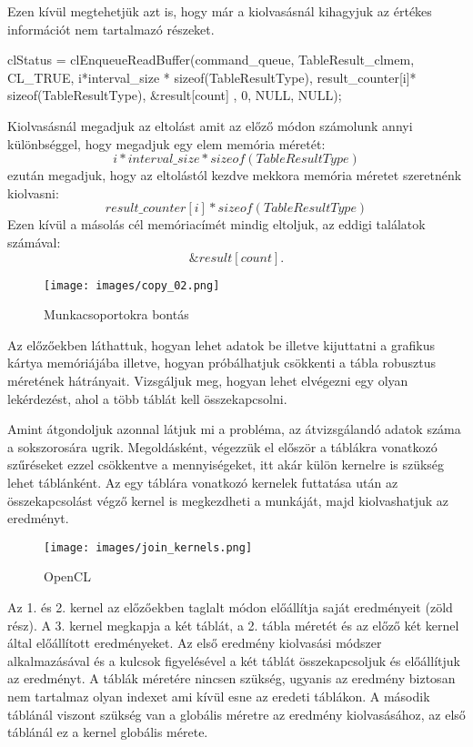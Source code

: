 Ezen kívül megtehetjük azt is, hogy már a kiolvasásnál kihagyjuk az értékes információt nem tartalmazó részeket.
\begin{python}
clStatus = clEnqueueReadBuffer(command_queue, TableResult_clmem, CL_TRUE, 
	i*interval_size * sizeof(TableResultType),
	result_counter[i]* sizeof(TableResultType), 
	&result[count]  , 0, NULL, NULL);
\end{python}

Kiolvasásnál megadjuk az eltolást amit az előző módon számolunk annyi különbséggel, hogy megadjuk egy elem memória méretét:
$$i * interval\_size * sizeof(TableResultType)$$ezután megadjuk, hogy az eltolástól kezdve mekkora memória méretet szeretnénk kiolvasni: $$result\_counter[i] * sizeof(TableResultType)$$Ezen kívül a másolás cél memóriacímét mindig eltoljuk, az eddigi találatok számával: $$\&result[count].$$

\begin{figure}[h!]
\centering
\texttt{[image: images/copy\_02.png]}
\caption{Munkacsoportokra bontás}
\label{fig:opencl}
\end{figure}


Az előzőekben láthattuk, hogyan lehet adatok be illetve kijuttatni a grafikus kártya memóriájába illetve, hogyan próbálhatjuk csökkenti a tábla robusztus méretének hátrányait.
Vizsgáljuk meg, hogyan lehet elvégezni egy olyan lekérdezést, ahol a több táblát kell összekapcsolni.

Amint átgondoljuk azonnal látjuk mi a probléma, az átvizsgálandó adatok száma a sokszorosára ugrik. Megoldásként, végezzük el először a táblákra vonatkozó szűréseket ezzel csökkentve a mennyiségeket, itt akár külön kernelre is szükség lehet táblánként.
Az egy táblára vonatkozó kernelek futtatása után az összekapcsolást végző kernel is megkezdheti a munkáját, majd kiolvashatjuk az eredményt.

\begin{figure}[h!]
\centering
\texttt{[image: images/join\_kernels.png]}
\caption{OpenCL}
\label{fig:opencl}
\end{figure}

Az 1. és 2. kernel az előzőekben taglalt módon előállítja saját eredményeit (zöld rész). 
A 3. kernel megkapja a két táblát, a 2. tábla méretét és az előző két kernel által előállított eredményeket.
Az első eredmény kiolvasási módszer alkalmazásával és a kulcsok figyelésével a két táblát összekapcsoljuk és előállítjuk az eredményt.
A táblák méretére nincsen szükség, ugyanis az eredmény biztosan nem tartalmaz olyan indexet ami kívül esne az eredeti táblákon. A második táblánál viszont szükség van a globális méretre az eredmény kiolvasásához, az első táblánál ez a kernel globális mérete.


